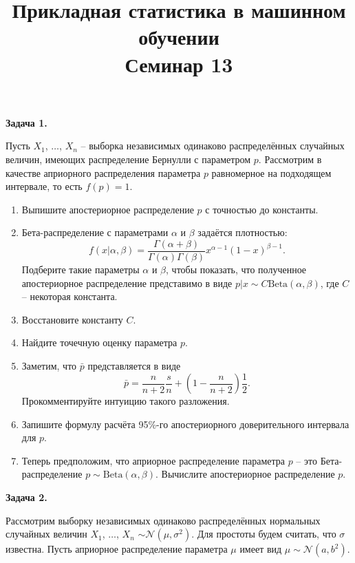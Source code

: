 \documentclass[10pt, a4paper]{extarticle}
\title{{\normalsize Прикладная статистика в машинном обучении} \\ \vspace{0.5em} Семинар 13}
\author{\rule{15cm}{0.4pt}}
\begin{document}
	
	\maketitle

	{\Large \textbf{Задача 1.}} 
	
	Пусть $X_1$, $\ldots$, $X_n$ -- выборка независимых одинаково распределённых случайных величин, имеющих распределение Бернулли с параметром $p$. Рассмотрим в качестве априорного распределения параметра $p$ равномерное на подходящем интервале, то есть $f(p) = 1$.
	\begin{enumerate}[label = \alph*)]
		\item Выпишите апостериорное распределение $p$ с точностью до константы.
		\item Бета-распределение с параметрами $\alpha$ и $\beta$ задаётся плотностью:
		\[
		f(x | \alpha, \beta) = \dfrac{\Gamma(\alpha + \beta)}{\Gamma(\alpha)\Gamma(\beta)}x^{\alpha - 1}(1-x)^{\beta - 1}.
		\]
		Подберите такие параметры $\alpha$ и $\beta$, чтобы показать, что полученное апостериорное распределение представимо в виде $p|x \sim C\mathrm{Beta}(\alpha, \beta)$, где $C$ -- некоторая константа.
		\item Восстановите константу $C$.
		\item Найдите точечную оценку параметра $p$.
		\item Заметим, что $\bar{p}$ представляется в виде
		\[
		\bar{p} = \dfrac{n}{n + 2}\dfrac{s}{n} + \left(1 - \dfrac{n}{n+2}\right)\dfrac{1}{2}.
		\]
		Прокомментируйте интуицию такого разложения.
		\item Запишите формулу расчёта 95\%-го апостериорного доверительного интервала для $p$.
		\item Теперь предположим, что априорное распределение параметра $p$ -- это Бета-распределение $p \sim \mathrm{Beta}(\alpha, \beta)$. Вычислите апостериорное распределение $p$.
	\end{enumerate}
	\vspace{1em}
	
	{\Large \textbf{Задача 2.}} 
	
	Рассмотрим выборку независимых одинаково распределённых нормальных случайных величин $X_1$, $\ldots$, $X_n$ $\sim \mathcal{N}(\mu, \sigma^2)$. Для простоты будем считать, что $\sigma$ известна. Пусть априорное распределение параметра $\mu$ имеет вид $\mu \sim \mathcal{N}(a, b^2)$.
	
\end{document}
